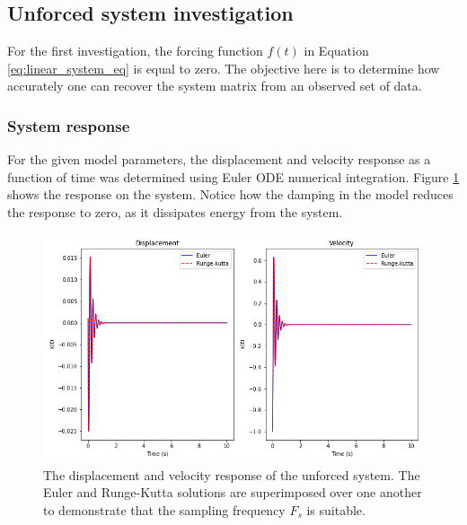 \documentclass{article}
\begin{document}
\subsection{Unforced system investigation}
For the first investigation, the forcing function $f(t)$ in Equation \eqref{eq:linear_system_eq} is equal to zero. The objective here is to determine how accurately one can recover the system matrix from an observed set of data. 

\subsubsection{System response}
 For the given model parameters, the displacement and velocity response as a function of time was determined using Euler ODE numerical integration. Figure \ref{fig:Q4a_1} shows the response on the system. Notice how the damping in the model reduces the response to zero, as it dissipates energy from the system.
\begin{figure}
    \centering
    \includegraphics[scale = 0.5]{Q4a_fig1.png}
    \caption{The displacement and velocity response of the unforced system. The Euler and Runge-Kutta solutions are superimposed over one another to demonstrate that the sampling frequency $F_s$ is suitable.}
    \label{fig:Q4a_1}
\end{figure}
\end{document}
